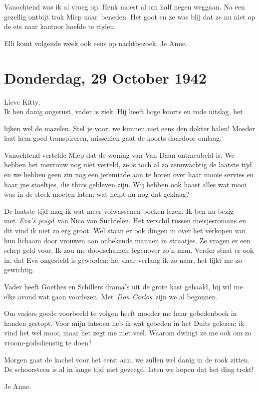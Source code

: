 \documentclass{book}
\begin{document}
Vanochtend was ik al vroeg op. Henk moest al om half negen weggaan. Na
een gezellig ontbijt trok Miep naar~beneden. Het goot en ze was blij dat
ze nu niet op de ets naar kantoor hoefde te rijden.

Elli komt volgende week ook eens op nachtbezoek. Je Anne.

\chapter{Donderdag, 29 October 1942}

Lieve Kitty,\\Ik ben danig ongerust, vader is ziek. Hij heeft hoge
koorts en rode uitslag, het

lijken wel de mazelen. Stel je voor, we kunnen niet eens den dokter
halen! Moeder laat hem goed transpireren, misschien gaat de koorts
daardoor omlaag.

Vanochtend vertelde Miep dat de woning van Van Daan ontmeubeld is. We
hebben het mevrouw nog niet verteld, ze is toch al zo zenuwachtig de
laatste tijd en we hebben geen zin nog een jeremiade aan te horen over
haar mooie servies en haar jne stoeltjes, die thuis gebleven zijn. Wij
hebben ook haast alles wat mooi was in de steek moeten laten; wat helpt
nu nog dat geklaag?

De laatste tijd mag ik wat meer volwassenen-boeken lezen. Ik ben nu
bezig met~\emph{Eva's jeugd}~van Nico van Suchtelen. Het verschil tussen
meisjesromans en dit vind ik niet zo erg groot. Wel staan er ook dingen
in over het verkopen van hun lichaam door vrouwen aan onbekende mannen
in straatjes. Ze vragen er een schep geld voor. Ik zou me doodschamen
tegenover zo'n man. Verder staat er ook in, dat Eva ongesteld is
geworden; hè, daar verlang ik zo naar, het lijkt me zo gewichtig.

Vader heeft Goethes en Schillers drama's uit de grote kast gehaald, hij
wil me elke avond wat gaan voorlezen. Met~\emph{Don Carlos}~zijn we al
begonnen.

Om vaders goede voorbeeld te volgen heeft moeder me haar gebedenboek in
handen gestopt. Voor mijn fatsoen heb ik wat gebeden in het Duits
gelezen; ik vind het wel mooi, maar het zegt me niet veel. Waarom dwingt
ze me ook om zo vroom-godsdienstig te doen?

Morgen gaat de kachel voor het eerst aan, we zullen wel danig in de rook
zitten. De schoorsteen is al in lange tijd niet geveegd, laten we hopen
dat het ding trekt!

Je Anne.
\end{document}
